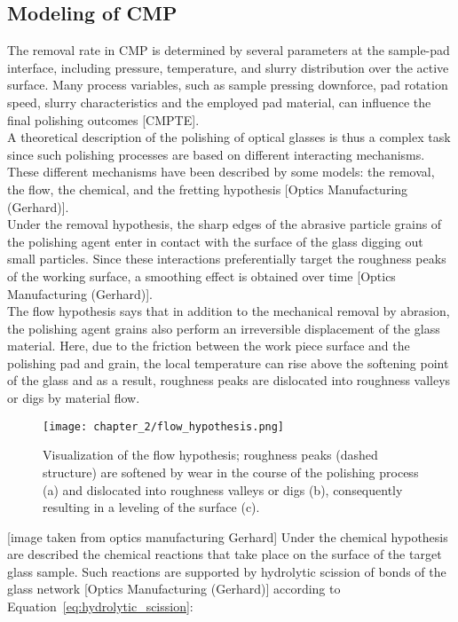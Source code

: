 \subsection{Modeling of CMP}
The removal rate in CMP is determined by several parameters at the sample-pad interface, including pressure, temperature, and slurry distribution over the active surface. Many process variables, such as sample pressing downforce, pad rotation speed, slurry characteristics and the employed pad material, can influence the final polishing outcomes [CMPTE].
\\
A theoretical description of the polishing of optical glasses is thus a complex task since such polishing processes are based on different interacting mechanisms. These different mechanisms have been described by some models: the removal, the flow, the chemical, and the fretting hypothesis [Optics Manufacturing (Gerhard)].
\\
Under the removal hypothesis, the sharp edges of the abrasive particle grains of the polishing agent enter in contact with the surface of the glass digging out small particles. Since these interactions preferentially target the roughness peaks of the working surface, a smoothing effect is obtained over time [Optics Manufacturing (Gerhard)].
\\
The flow hypothesis says that in addition to the mechanical removal by abrasion, the polishing agent grains also perform an irreversible displacement of the glass material. Here, due to the friction between the work piece surface and the polishing pad and grain, the local temperature can rise above the softening point of the glass and as a result, roughness peaks are dislocated into roughness valleys or digs by material flow. 
\begin{figure}[H]
    \centering
    \texttt{[image: chapter\_2/flow\_hypothesis.png]}
    \caption[Visualization of the flow hypothesis.]{ Visualization of the flow hypothesis; roughness peaks (dashed structure) are softened by wear in the course of the polishing process (a) and dislocated into roughness valleys or digs (b), consequently resulting in a leveling of the surface (c).}
    \label{fig:flow_hypothesis}
\end{figure}
[image taken from optics manufacturing Gerhard]
Under the chemical hypothesis are described the chemical reactions that take place on the surface of the target glass sample. Such reactions are supported by hydrolytic scission of bonds of the glass network [Optics Manufacturing (Gerhard)] according to Equation~\ref{eq:hydrolytic_scission}:

